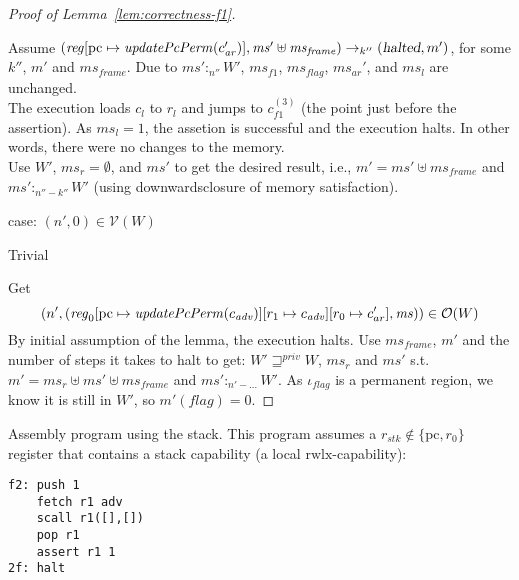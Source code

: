 \documentclass[a4paper]{article}
\newcommand{\update}[2]{[#1 \mapsto #2]}
\newcommand{\var}[1]{\mathit{#1}}
\newcommand{\hs}{\var{ms}}
\newcommand{\ms}{\hs}
\newcommand{\pcreg}{\mathrm{pc}}
\newcommand{\reg}{\var{reg}}
\newcommand{\heap}{\var{mem}}
\newcommand{\stk}{\var{stk}}
\newcommand{\flag}{\var{flag}}
\newcommand{\halted}{\textsl{halted}}
\newcommand{\plainfun}[2]{
  \ifthenelse{\equal{#2}{}}
  {\mathit{#1}}
  {\mathit{#1}(#2)}
}
\newcommand{\updatePcPerm}[1]{\plainfun{updatePcPerm}{#1}}
\newcommand{\futurestr}{\mathbin{\sqsupseteq}^{\var{priv}}}
\newcommand{\heapSat}[3][\heap]{#1 :_{#2} #3}
\newcommand{\asmType}{\plaindom{AsmType}}
\newcommand{\plaindom}[1]{\mathrm{#1}}
\newcommand{\intr}[2]{\mathcal{#1}}
\newcommand{\valueintr}[1]{\intr{V}{#1}}
\newcommand{\stdvr}{\valueintr{\asmType}}
\newcommand{\observations}{\mathcal{O}}
\newcommand{\npair}[2][n]{\left(#1,#2 \right)}
\newcommand{\plainperm}[1]{\mathrm{#1}}
\newcommand{\rwlx}{\plainperm{rwlx}}
\newcommand{\step}[1][]{\rightarrow_{#1}}
\begin{document}
\begin{proof}[Proof of Lemma~\ref{lem:correctness-f1}]
\begin{enumproof}[resume]
\begin{enumproof}
\begin{enumproof}
                      Assume $(\reg\update{\pcreg}{\updatePcPerm{c_{\var{ar}}'}},\ms' \uplus \ms_{\var{frame}}) \step[k''] (\halted, m')$, for some $k''$, $m'$ and $\ms_{\var{frame}}$. Due to $\heapSat[\ms']{n''}{W'}$, $\ms_{f1}$, $\ms_\flag$, $\ms_{\var{ar}}'$, and $\ms_l$ are unchanged. \\
                      The execution loads $c_l$ to $r_l$ and jumps to $c_{f1}^{(3)}$ (the point just before the assertion). As $\ms_l = 1$, the assetion is successful and the execution halts. In other words, there were no changes to the memory.\\
                      Use $W'$, $\ms_r = \emptyset$, and $\ms'$ to get the desired result, i.e., $m' = \ms' \uplus \ms_{\var{frame}}$ and $\heapSat[\ms']{n''-k''}{W'}$ (using downwardsclosure of memory satisfaction).          
                    \end{enumproof}
                  \item case: $\npair[n']{0} \in \stdvr(W)$
                    \begin{enumproof}
                    \item Trivial
                    \end{enumproof}
                  \end{enumproof}
                \end{enumproof}
                Get
                \[
                  \npair[n']{(\reg_0\update{\pcreg}{\updatePcPerm{c_{\var{adv}}}}\update{r_1}{c_{\var{adv}}}\update{r_0}{c_{ar}'},\ms)} \in \observations(W)
                \]
                By initial assumption of the lemma, the execution halts. Use $\ms_{\var{frame}}$, $m'$ and the number of steps it takes to halt to get:
                $W' \futurestr W$, $\ms_r$ and $\ms'$ s.t. $m' = \ms_r \uplus \ms' \uplus \ms_{\var{frame}}$ and $\heapSat[\ms']{n' - \dots}{W'}$. As $\iota_\flag$ is a permanent region, we know it is still in $W'$, so $m'(\flag) = 0$.
              \end{proof}


              Assembly program using the stack. This program assumes a $r_\stk \not\in \{\pcreg,r_0\}$ register that contains a stack capability (a local $\rwlx$-capability):
\begin{verbatim}
f2: push 1
    fetch r1 adv
    scall r1([],[])
    pop r1
    assert r1 1
2f: halt
\end{verbatim}
              
\end{document}
